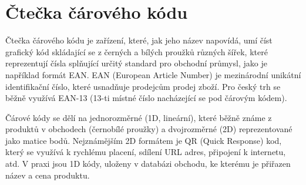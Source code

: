 
\section{Čtečka čárového kódu}
Čtečka čárového kódu je zařízení, které, jak jeho název napovídá, umí číst grafický kód skládající se z černých a bílých proužků různých šířek, které reprezentují čísla splňující určitý standard pro obchodní průmysl, jako je například formát EAN. EAN (European Article Number) je mezinárodní unikátní identifikační číslo, které usnadňuje prodejcům prodej zboží. Pro český trh se běžně využívá EAN-13 (13-ti místné číslo nacházející se pod čárovým kódem). 

Čárové kódy se dělí na jednorozměrné (1D, lineární), které běžně známe z produktů v obchodech (černobílé proužky) a dvojrozměrné (2D) reprezentované jako matice bodů. Nejznámějším 2D formátem je QR (Quick Response) kod, který se využívá k rychlému placení, sdílení URL adres, připojení k internetu, atd. V praxi jsou 1D kódy, uloženy v databázi obchodu, ke kterému je přiřazen název a cena produktu.






